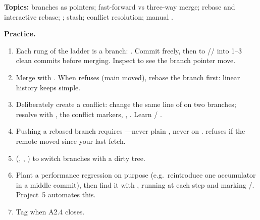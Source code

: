 \begin{gitbox}
\textbf{Topics:} branches as pointers; fast-forward vs three-way merge; rebase and interactive rebase; ; stash; conflict resolution; manual .

\textbf{Practice.}
\begin{enumerate}
  \item Each rung of the ladder is a branch: . Commit freely, then  to // into 1--3 clean commits before merging. Inspect  to see the branch pointer move.
  \item Merge with . When  refuses (main moved), rebase the branch first: linear history keeps  simple.
  \item Deliberately create a conflict: change the same line of  on two branches; resolve with , the conflict markers, , . Learn  / .
  \item Pushing a rebased branch requires ---never plain , never on .  refuses if the remote moved since your last fetch.
  \item {} (, , ) to switch branches with a dirty tree.
  \item Plant a performance regression on purpose (e.g.\ reintroduce one accumulator in a middle commit), then find it with , running  at each step and marking /. Project~5 automates this.
  \item Tag  when A2.4 closes.
\end{enumerate}
\end{gitbox}
